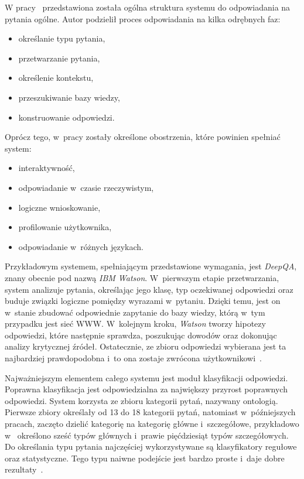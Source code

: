 W pracy~\cite{lapshin2012question} przedstawiona została ogólna struktura systemu do odpowiadania na pytania ogólne. Autor podzielił proces odpowiadania na kilka odrębnych faz:
\begin{itemize}
	\item określanie typu pytania,
	\item przetwarzanie pytania,
	\item określenie kontekstu,
	\item przeszukiwanie bazy wiedzy,
	\item konstruowanie odpowiedzi.
\end{itemize}

Oprócz tego, w~pracy zostały określone obostrzenia, które powinien spełniać system:
\begin{itemize}
	\item interaktywność,
	\item odpowiadanie w~czasie rzeczywistym,
	\item logiczne wnioskowanie,
	\item profilowanie użytkownika,
	\item odpowiadanie w~różnych językach.
\end{itemize}

Przykładowym systemem, spełniającym przedstawione wymagania, jest \emph{DeepQA}, znany obecnie pod nazwą \emph{IBM Watson}. W~pierwszym etapie przetwarzania, system analizuje pytania, określając jego klasę, typ oczekiwanej odpowiedzi oraz buduje związki logiczne pomiędzy wyrazami w~pytaniu. Dzięki temu, jest on w~stanie zbudować odpowiednie zapytanie do bazy wiedzy, którą w~tym przypadku jest sieć WWW. W~kolejnym kroku, \emph{Watson} tworzy hipotezy odpowiedzi, które następnie sprawdza, poszukując dowodów oraz dokonując analizy krytycznej źródeł. Ostatecznie, ze zbioru odpowiedzi wybierana jest ta najbardziej prawdopodobna i~to ona zostaje zwrócona użytkownikowi~\cite{lapshin2012question}.

Najważniejszym elementem całego systemu jest moduł klasyfikacji odpowiedzi. Poprawna klasyfikacja jest odpowiedzialna za największy przyrost poprawnych odpowiedzi. System korzysta ze zbioru kategorii pytań, nazywany ontologią. Pierwsze zbiory określały od 13 do 18 kategorii pytań, natomiast w~późniejszych pracach, zaczęto dzielić kategorię na kategorię główne i~szczegółowe, przykładowo w~\cite{li2002learning} określono sześć typów głównych i~prawie pięćdziesiąt typów szczegółowych. Do określania typu pytania najczęściej wykorzystywane są klasyfikatory regułowe oraz statystyczne. Tego typu naiwne podejście jest bardzo proste i~daje dobre rezultaty~\cite{lapshin2012question}.

